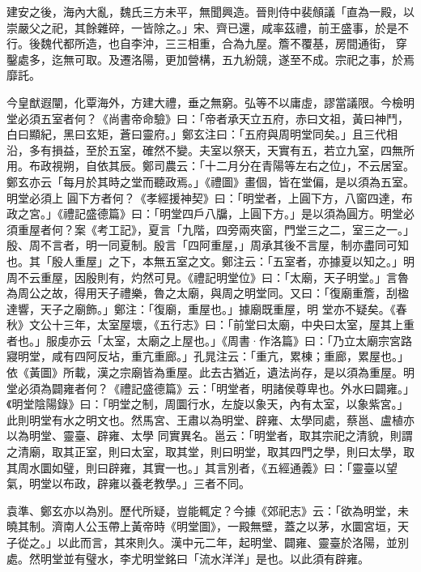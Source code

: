 \begin{pinyinscope}
 建安之後，海內大亂，魏氏三方未平，無聞興造。晉則侍中裴頠議「直為一殿，以崇嚴父之祀，其餘雜碎，一皆除之。」宋、齊已還，咸率茲禮，前王盛事，於是不行。後魏代都所造，也自李沖，三三相重，合為九屋。簷不覆基，房間通街，
 穿鑿處多，迄無可取。及遷洛陽，更加營構，五九紛競，遂至不成。宗祀之事，於焉靡託。



 今皇猷遐闡，化覃海外，方建大禮，垂之無窮。弘等不以庸虛，謬當議限。今檢明堂必須五室者何？《尚書帝命驗》曰：「帝者承天立五府，赤曰文祖，黃曰神鬥，白曰顯紀，黑曰玄矩，蒼曰靈府。」鄭玄注曰：「五府與周明堂同矣。」且三代相沿，多有損益，至於五室，確然不變。夫室以祭天，天實有五，若立九室，四無所用。布政視朔，自依其辰。鄭司農云：「十二月分在青陽等左右之位」，不云居室。鄭玄亦云「每月於其時之堂而聽政焉。」《禮圖》畫個，皆在堂偏，是以須為五室。明堂必須上
 圓下方者何？《孝經援神契》曰：「明堂者，上圓下方，八窗四達，布政之宮。」《禮記盛德篇》曰：「明堂四戶八牖，上圓下方。」是以須為圓方。明堂必須重屋者何？案《考工記》，夏言「九階，四旁兩夾窗，門堂三之二，室三之一。」殷、周不言者，明一同夏制。殷言「四阿重屋，」周承其後不言屋，制亦盡同可知也。其「殷人重屋」之下，本無五室之文。鄭注云：「五室者，亦據夏以知之。」明周不云重屋，因殷則有，灼然可見。《禮記明堂位》曰：「太廟，天子明堂。」言魯為周公之故，得用天子禮樂，魯之太廟，與周之明堂同。又曰：「復廟重簷，刮楹達響，天子之廟飾。」鄭注：「復廟，重屋也。」據廟既重屋，明
 堂亦不疑矣。《春秋》文公十三年，太室屋壞，《五行志》曰：「前堂曰太廟，中央曰太室，屋其上重者也。」服虔亦云「太室，太廟之上屋也。」《周書·作洛篇》曰：「乃立太廟宗宮路寢明堂，咸有四阿反坫，重亢重廊。」孔晁注云：「重亢，累棟；重廊，累屋也。」依《黃圖》所載，漢之宗廟皆為重屋。此去古猶近，遺法尚存，是以須為重屋。明堂必須為闢雍者何？《禮記盛德篇》云：「明堂者，明諸侯尊卑也。外水曰闢雍。」《明堂陰陽錄》曰：「明堂之制，周圜行水，左旋以象天，內有太室，以象紫宮。」此則明堂有水之明文也。然馬宮、王肅以為明堂、辟雍、太學同處，蔡邕、盧植亦以為明堂、靈臺、辟雍、太學
 同實異名。邕云：「明堂者，取其宗祀之清貌，則謂之清廟，取其正室，則曰太室，取其堂，則曰明堂，取其四門之學，則曰太學，取其周水圜如璧，則曰辟雍，其實一也。」其言別者，《五經通義》曰：「靈臺以望氣，明堂以布政，辟雍以養老教學。」三者不同。



 袁準、鄭玄亦以為別。歷代所疑，豈能輒定？今據《郊祀志》云：「欲為明堂，未曉其制。濟南人公玉帶上黃帝時《明堂圖》，一殿無壁，蓋之以茅，水圜宮垣，天子從之。」以此而言，其來則久。漢中元二年，起明堂、闢雍、靈臺於洛陽，並別處。然明堂並有璧水，李尤明堂銘曰「流水洋洋」是也。以此須有辟雍。




\end{pinyinscope}
